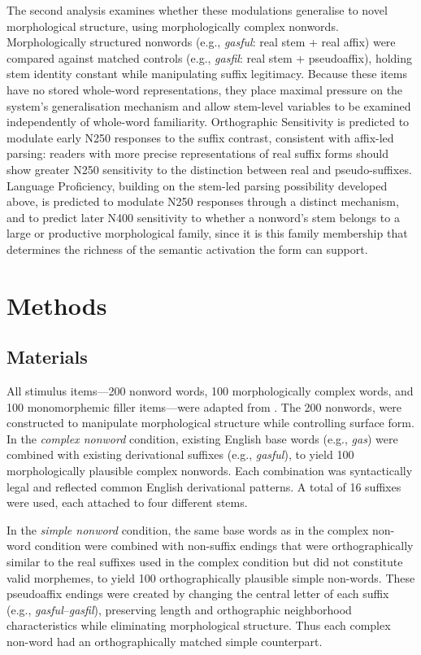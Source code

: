 \documentclass[utf8]{FrontiersinHarvard} %
\begin{document}
	The second analysis examines whether these modulations generalise to novel morphological structure, using morphologically complex nonwords. Morphologically structured nonwords (e.g., \textit{gasful}: real stem + real affix) were compared against matched controls (e.g., \textit{gasfil}: real stem + pseudoaffix), holding stem identity constant while manipulating suffix legitimacy. Because these items have no stored whole-word representations, they place maximal pressure on the system's generalisation mechanism and allow stem-level variables to be examined independently of whole-word familiarity. Orthographic Sensitivity is predicted to modulate early N250 responses to the suffix contrast, consistent with affix-led parsing: readers with more precise representations of real suffix forms should show greater N250 sensitivity to the distinction between real and pseudo-suffixes. Language Proficiency, building on the stem-led parsing possibility developed above, is predicted to modulate N250 responses through a distinct mechanism, and to predict later N400 sensitivity to whether a nonword's stem belongs to a large or productive morphological family, since it is this family membership that determines the richness of the semantic activation the form can support.

	
	\section{Methods}
	
	\subsection{Materials}
	
	All stimulus items---200 nonword words, 100 morphologically complex words, and 100 monomorphemic filler items---were adapted from \citet{sawiIndividualDifferencesSensitivity2016}. The 200 nonwords, were constructed to manipulate morphological structure while controlling surface form. In the \textit{complex nonword} condition, existing English base words (e.g., \textit{gas}) were combined with existing derivational suffixes (e.g., \textit{gasful}), to yield 100 morphologically plausible complex nonwords. Each combination was syntactically legal and reflected common English derivational patterns. A total of 16 suffixes were used, each attached to four different stems.
	
	In the \textit{simple nonword} condition, the same base words as in the complex non-word condition were combined with non-suffix endings that were orthographically similar to the real suffixes used in the complex condition but did not constitute valid morphemes, to yield 100 orthographically plausible simple non-words. These pseudoaffix endings were created by changing the central letter of each suffix (e.g., \textit{gasful}–\textit{gasfil}), preserving length and orthographic neighborhood characteristics while eliminating morphological structure. Thus each complex non-word had an orthographically matched simple counterpart.
	
\end{document}

